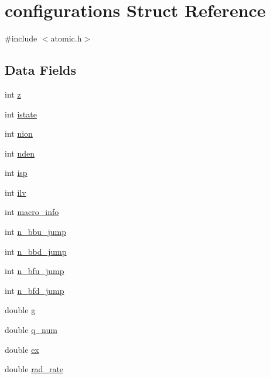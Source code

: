 \hypertarget{structconfigurations}{}\section{configurations Struct Reference}
\label{structconfigurations}


{\ttfamily \#include $<$atomic.\+h$>$}

\subsection*{Data Fields}
\begin{DoxyCompactItemize}
\item 
int \hyperlink{structconfigurations_ae97a36c9d803a4a888b73f5c9d589889}{z}
\item 
int \hyperlink{structconfigurations_a03fea0f1f2b5829f8af02ef8fcb74396}{istate}
\item 
int \hyperlink{structconfigurations_a71c012478e0a6589d2ebca2f50d977d6}{nion}
\item 
int \hyperlink{structconfigurations_a61b972e882a25cc3fb22de0cdb797103}{nden}
\item 
int \hyperlink{structconfigurations_ab682115e8a37d6e26f14720187498611}{isp}
\item 
int \hyperlink{structconfigurations_a5282ad8d6e8d97c88fd8b18ecfe10125}{ilv}
\item 
int \hyperlink{structconfigurations_a0555a72dd4b9ae3b7eb1d2811e3a687a}{macro\+\_\+info}
\item 
int \hyperlink{structconfigurations_a9e1d8406fcb5d8d371e61e11750653a7}{n\+\_\+bbu\+\_\+jump}
\item 
int \hyperlink{structconfigurations_ade544b4d373e9e586f689a19330037ec}{n\+\_\+bbd\+\_\+jump}
\item 
int \hyperlink{structconfigurations_aeab07933f8fe82391d5c8f3e4113d1bd}{n\+\_\+bfu\+\_\+jump}
\item 
int \hyperlink{structconfigurations_acfee0b128e4e7c2a4e6aea0687a233d9}{n\+\_\+bfd\+\_\+jump}
\item 
double \hyperlink{structconfigurations_a568aa359240b411f0774506fb0857f7c}{g}
\item 
double \hyperlink{structconfigurations_aac0f28472beb93aeef475bc21e5f0a23}{q\+\_\+num}
\item 
double \hyperlink{structconfigurations_a7759058c9db6702f3e3cefa8c2506110}{ex}
\item 
double \hyperlink{structconfigurations_abf1125a802f1740cae3bf0ed4b553601}{rad\+\_\+rate}

\end{DoxyCompactItemize}
